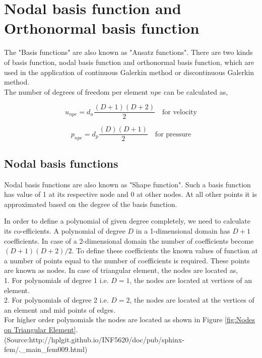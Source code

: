 \documentclass[a4paper,openany]{book}
\begin{document}
\section[Basis function]{Nodal basis function and Orthonormal basis function}

The "Basis functions" are also known as "Ansatz functions". There are two kinds of basis function, nodal basis function and orthonormal basis function, which are used in the application of continuous Galerkin method or discontinuous Galerkin method. \\

The number of degrees of freedom per element $npe$ can be calculated as,

\begin{equation} \label{unpe}
u_{npe} = d_u \frac{(D+1)(D+2)}{2} \quad \textrm{for velocity}
\end{equation} 

\begin{equation} \label{pnpe}
p_{npe} = d_p \frac{(D)(D+1)}{2} \quad \textrm{for pressure}
\end{equation} 


\subsection{Nodal basis functions}

Nodal basis functions are also known as "Shape function". Such a basis function has value of 1 at its respective node and 0 at other nodes. At all other points it is approximated based on the degree of the basis function. 

In order to define a polynomial of given degree completely, we need to calculate its co-efficients. A polynomial of degree $D$ in a 1-dimensional domain has $D+1$ coefficients. In case of a 2-dimensional domain the number of coefficients become $(D+1)(D+2)/2$. To define these coefficients the known values of function at a number of points equal to the number of coefficients is required. These points are known as nodes. In case of triangular element, the nodes are located as,\\
1. For polynomials of degree 1 i.e. $D=1$, the nodes are located at vertices of an element.\\
2. For polynomials of degree 2 i.e. $D=2$, the nodes are located at the vertices of an element and mid points of edges.\\

For higher order polynomials the nodes are located as shown in Figure \ref{fig:Nodes on Triangular Element}. (Source:http://hplgit.github.io/INF5620/doc/pub/sphinx-fem/.\_main\_fem009.html)  
\end{document}
